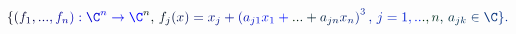 \documentclass[12pt]{article}
\begin{document}
\makeatletter
\renewcommand*{\@textcolor}[3]{%
  \protect\leavevmode
  \begingroup
    \color#1{#2}#3%
  \endgroup
}
\makeatother
\begin{displaymath}
\mathcolor[RGB]{0,0,15}{\{} \mathcolor[RGB]{0,0,30}{(} \mathcolor[RGB]{0,0,45}{f} _ { \mathcolor[RGB]{0,0,60}{1} } \mathcolor[RGB]{0,0,75}{,} \mathcolor[RGB]{0,0,90}{.} \mathcolor[RGB]{0,0,105}{.} \mathcolor[RGB]{0,0,120}{.} \mathcolor[RGB]{0,0,135}{,} \mathcolor[RGB]{0,0,150}{f} _ { \mathcolor[RGB]{0,0,165}{n} } \mathcolor[RGB]{0,0,180}{)} \mathcolor[RGB]{0,0,195}{:} \mathcolor[RGB]{0,0,210}{\C} ^ { \mathcolor[RGB]{0,0,225}{n} } \mathcolor[RGB]{0,0,240}{\rightarrow} \mathcolor[RGB]{0,0,255}{\C} ^ { \mathcolor[RGB]{0,15,0}{n} } \mathcolor[RGB]{0,15,15}{,} \mathcolor[RGB]{0,15,30}{\,
f} _ { \mathcolor[RGB]{0,15,45}{j} } \mathcolor[RGB]{0,15,60}{(} \mathcolor[RGB]{0,15,75}{x} \mathcolor[RGB]{0,15,90}{)} \mathcolor[RGB]{0,15,105}{=} \mathcolor[RGB]{0,15,120}{x} _ { \mathcolor[RGB]{0,15,135}{j} } \mathcolor[RGB]{0,15,150}{+} \mathcolor[RGB]{0,15,165}{\left(} \mathcolor[RGB]{0,15,180}{a} _ { \mathcolor[RGB]{0,15,195}{j} \mathcolor[RGB]{0,15,210}{1} } \mathcolor[RGB]{0,15,225}{x} _ { \mathcolor[RGB]{0,15,240}{1} } \mathcolor[RGB]{0,15,255}{+} \mathcolor[RGB]{0,30,0}{.} \mathcolor[RGB]{0,30,15}{.} \mathcolor[RGB]{0,30,30}{.} \mathcolor[RGB]{0,30,45}{+} \mathcolor[RGB]{0,30,60}{a} _ { \mathcolor[RGB]{0,30,75}{j} \mathcolor[RGB]{0,30,90}{n} } \mathcolor[RGB]{0,30,105}{x} _ { \mathcolor[RGB]{0,30,120}{n} } \mathcolor[RGB]{0,30,135}{\right)} ^ { \mathcolor[RGB]{0,30,150}{3} } \mathcolor[RGB]{0,30,165}{,} \, \mathcolor[RGB]{0,30,180}{j} \mathcolor[RGB]{0,30,195}{=} \mathcolor[RGB]{0,30,210}{1} \mathcolor[RGB]{0,30,225}{,} \mathcolor[RGB]{0,30,240}{.} \mathcolor[RGB]{0,30,255}{.} \mathcolor[RGB]{0,45,0}{.} \mathcolor[RGB]{0,45,15}{,} \mathcolor[RGB]{0,45,30}{n} \mathcolor[RGB]{0,45,45}{,} \, \mathcolor[RGB]{0,45,60}{a} _ { \mathcolor[RGB]{0,45,75}{j} \mathcolor[RGB]{0,45,90}{k} } \mathcolor[RGB]{0,45,105}{\in} \mathcolor[RGB]{0,45,120}{\C} \mathcolor[RGB]{0,45,135}{\}} \mathcolor[RGB]{0,45,150}{.}
\end{displaymath}
\end{document}
